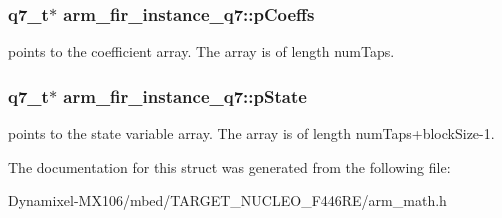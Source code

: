 \subsubsection[{\texorpdfstring{p\+Coeffs}{pCoeffs}}]{\setlength{\rightskip}{0pt plus 5cm}q7\+\_\+t$\ast$ arm\+\_\+fir\+\_\+instance\+\_\+q7\+::p\+Coeffs}\hypertarget{structarm__fir__instance__q7_a0e45aedefc3fffad6cb315c5b6e5bd49}{}\label{structarm__fir__instance__q7_a0e45aedefc3fffad6cb315c5b6e5bd49}
points to the coefficient array. The array is of length num\+Taps. 
\subsubsection[{\texorpdfstring{p\+State}{pState}}]{\setlength{\rightskip}{0pt plus 5cm}q7\+\_\+t$\ast$ arm\+\_\+fir\+\_\+instance\+\_\+q7\+::p\+State}\hypertarget{structarm__fir__instance__q7_aaddea3b9c7e16ddfd9428b7bf9f9c200}{}\label{structarm__fir__instance__q7_aaddea3b9c7e16ddfd9428b7bf9f9c200}
points to the state variable array. The array is of length num\+Taps+block\+Size-\/1. 

The documentation for this struct was generated from the following file\+:\begin{DoxyCompactItemize}
\item 
Dynamixel-\/\+M\+X106/mbed/\+T\+A\+R\+G\+E\+T\+\_\+\+N\+U\+C\+L\+E\+O\+\_\+\+F446\+R\+E/arm\+\_\+math.\+h\end{DoxyCompactItemize}
